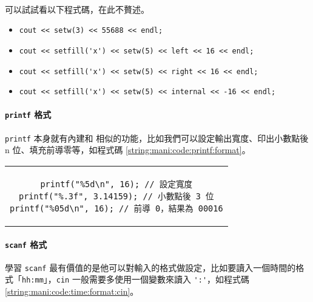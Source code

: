 \documentclass[12pt,a4paper,oneside]{article}
\begin{document}
\begin{CJK}{UTF8}{bkai}
\paragraph{}可以試試看以下程式碼，在此不贅述。
\begin{itemize}
\item \lstinline!cout << setw(3) << 55688 << endl;!
\item \lstinline!cout << setfill('x') << setw(5) << left << 16 << endl;!
\item \lstinline!cout << setfill('x') << setw(5) << right << 16 << endl;!
\item \lstinline!cout << setfill('x') << setw(5) << internal << -16 << endl;!
\end{itemize}

\paragraph{\lstinline!printf! 格式}\lstinline!printf! 本身就有內建和  相似的功能，比如我們可以設定輸出寬度、印出小數點後 n 位、填充前導零等，如程式碼 \ref{string:mani:code:printf:format}。

\begin{code}
  \centering
  \begin{tabular}{c}
  \begin{lstlisting}
printf("%5d\n", 16); // 設定寬度
printf("%.3f", 3.14159); // 小數點後 3 位
printf("%05d\n", 16); // 前導 0，結果為 00016
  \end{lstlisting}
  \end{tabular}
  \caption{\lstinline!printf! 格式範例}
  \label{string:mani:code:printf:format}
\end{code}

\paragraph{\lstinline!scanf! 格式}學習 \lstinline!scanf! 最有價值的是他可以對輸入的格式做設定，比如要讀入一個時間的格式「\lstinline!hh:mm!」，\lstinline!cin! 一般需要多使用一個變數來讀入 \lstinline!':'!，如程式碼 \ref{string:mani:code:time:format:cin}。


\end{CJK}
\end{document}
